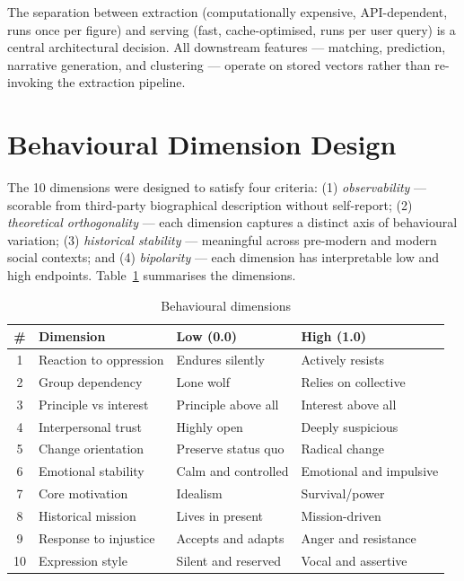 \documentclass[11pt, a4paper]{report}
\begin{document}
The separation between extraction (computationally expensive, API-dependent, runs once per figure) and serving (fast, cache-optimised, runs per user query) is a central architectural decision. All downstream features — matching, prediction, narrative generation, and clustering — operate on stored vectors rather than re-invoking the extraction pipeline.

\section{Behavioural Dimension Design}

The 10 dimensions were designed to satisfy four criteria: (1) \textit{observability} — scorable from third-party biographical description without self-report; (2) \textit{theoretical orthogonality} — each dimension captures a distinct axis of behavioural variation; (3) \textit{historical stability} — meaningful across pre-modern and modern social contexts; and (4) \textit{bipolarity} — each dimension has interpretable low and high endpoints. Table~\ref{tab:dimensions} summarises the dimensions.

\begin{table}[H]
  \centering
  \caption{Behavioural dimensions}
  \label{tab:dimensions}
  \begin{tabular}{clll}
    \toprule
    \# & Dimension & Low (0.0) & High (1.0) \\
    \midrule
    1 & Reaction to oppression & Endures silently & Actively resists \\
    2 & Group dependency & Lone wolf & Relies on collective \\
    3 & Principle vs interest & Principle above all & Interest above all \\
    4 & Interpersonal trust & Highly open & Deeply suspicious \\
    5 & Change orientation & Preserve status quo & Radical change \\
    6 & Emotional stability & Calm and controlled & Emotional and impulsive \\
    7 & Core motivation & Idealism & Survival/power \\
    8 & Historical mission & Lives in present & Mission-driven \\
    9 & Response to injustice & Accepts and adapts & Anger and resistance \\
    10 & Expression style & Silent and reserved & Vocal and assertive \\
    \bottomrule
  \end{tabular}
\end{table}
\end{document}
